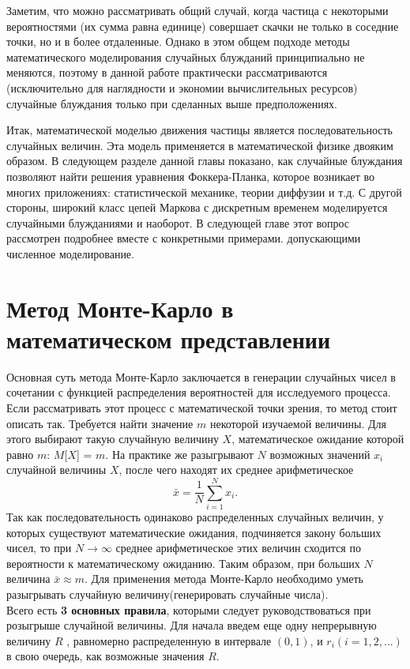 \documentclass[a4paper]{report}
\begin{document}
Заметим, что можно рассматривать общий случай, когда частица с некоторыми вероятностями (их сумма равна единице) совершает скачки не только в соседние точки, но и в более отдаленные. Однако в этом общем подходе методы математического моделирования случайных блужданий принципиально не меняются, поэтому в данной работе практически рассматриваются (исключительно для наглядности и экономии вычислительных ресурсов) случайные блуждания только при сделанных выше предположениях.

Итак, математической моделью движения частицы является последовательность случайных величин. Эта модель применяется в математической физике двояким образом. В следующем разделе данной главы показано, как случайные блуждания позволяют найти решения уравнения Фоккера-Планка, которое возникает во многих приложениях: статистической механике, теории диффузии и т.д. С другой стороны, широкий класс цепей Маркова с дискретным временем моделируется случайными блужданиями и наоборот. В следующей главе этот вопрос рассмотрен подробнее вместе с конкретными примерами. допускающими численное моделирование.



\newpage\section{Метод Монте-Карло в математическом представлении}

Основная суть метода Монте-Карло заключается в генерации случайных чисел в сочетании с функцией распределения вероятностей для исследуемого процесса. Если рассматривать этот процесс с математической точки зрения, то метод стоит описать так. Требуется найти значение $m$ некоторой изучаемой величины. Для этого выбирают такую случайную
величину $X$, математическое ожидание которой равно $m$: $M[X$] = $m$.
На практике же разыгрывают $N$ возможных
значений $x_{i}$ случайной величины $X$, после чего находят их среднее арифметическое
\begin{equation}
\bar{x} = {\frac{1}{N}} \sum\limits_{i=1}^N x_{i}.
\end{equation}
Так как последовательность одинаково распределенных случайных величин, у которых существуют математические ожидания, подчиняется закону больших чисел, то при  $N\rightarrow\infty$ среднее арифметическое этих величин сходится по вероятности к математическому ожиданию. Таким образом, при больших $N$ величина $\bar{x}\approx m$.
Для применения метода Монте-Карло необходимо уметь разыгрывать случайную величину(генерировать случайные числа).
\\Всего есть \textbf{3 основных правила}, которыми следует руководствоваться при розыгрыше случайной величины.
Для начала введем еще одну непрерывную величину $R$ , равномерно распределенную в интервале $(0, 1)$, и $r_{i}(i = 1, 2, ...)$ в свою очередь, как возможные значения $R$.
\end{document}
